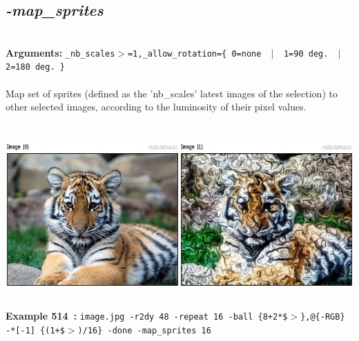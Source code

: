 \documentclass[a4paper,11pt,twoside]{book}
\begin{document}
\subsection{\emph{-map\_sprites} }\vspace*{-0.5em}
~\\\textbf{Arguments: } 
{\small \texttt{\_nb\_scales$>$=1,\_allow\_rotation=\{ 0=none ~$|$~ 1=90 deg. ~$|$~ 2=180 deg. \}}}\\~\\
Map set of sprites (defined as the 'nb\_scales' latest images of the selection) to other selected images,
according to the luminosity of their pixel values.
\begin{center}\includegraphics[keepaspectratio=true,height=7cm,width=\textwidth]{img/gmic_def514.jpg}\\
{\footnotesize \textbf{Example 514~:} \texttt{image.jpg -r2dy 48 -repeat 16 -ball \{8+2*\$$>$\},@\{-RGB\} -*[-1] \{(1+\$$>$)/16\} -done -map\_sprites 16}}
\end{center}
\end{document}
